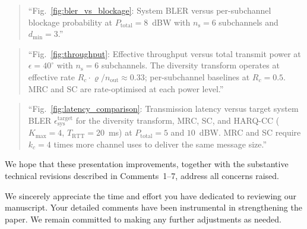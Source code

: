 \begin{quote}
``{\color{blue}Fig.~\ref{fig:bler_vs_blockage}: System BLER versus per-subchannel blockage probability at $P_{\mathrm{total}} = 8$~dBW with $n_{\mathrm{s}} = 6$ subchannels and $d_{\min} = 3$.}''
\end{quote}

\begin{quote}
``{\color{blue}Fig.~\ref{fig:throughput}: Effective throughput versus total transmit power at $\epsilon = 40^{\circ}$ with $n_{\mathrm{s}} = 6$ subchannels. The diversity transform operates at effective rate $R_c \cdot \varrho/n_{\mathrm{out}} \approx 0.33$; per-subchannel baselines at $R_c = 0.5$. MRC and SC are rate-optimised at each power level.}''
\end{quote}

\begin{quote}
``{\color{blue}Fig.~\ref{fig:latency_comparison}: Transmission latency versus target system BLER $\epsilon_{\mathrm{sys}}^{\mathrm{target}}$ for the diversity transform, MRC, SC, and HARQ-CC ($K_{\max} = 4$, $T_{\mathrm{RTT}} = 20$~ms) at $P_{\mathrm{total}} = 5$ and $10$~dBW. MRC and SC require $k_c = 4$ times more channel uses to deliver the same message size.}''
\end{quote}

We hope that these presentation improvements, together with the substantive technical revisions described in Comments~1--7, address all concerns raised.

\vskip 0.2in
We sincerely appreciate the time and effort you have dedicated to reviewing our manuscript. Your detailed comments have been instrumental in strengthening the paper. We remain committed to making any further adjustments as needed.
